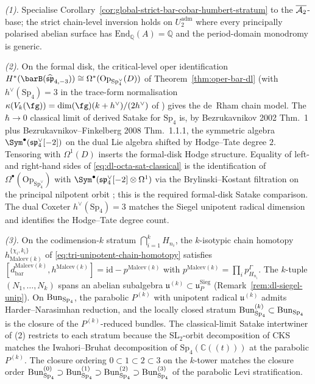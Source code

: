 \begin{remark}
\emph{(1).} Specialise
Corollary~\textup{\ref{cor:global-strict-bar-cobar-humbert-stratum}}
to the $\overline{\mathcal{A}_2}$-base; the strict chain-level inversion holds on
$U_2^{\mathrm{adm}}$ where every principally polarised abelian
surface has $\mathrm{End}_{\mathbb{Q}}(A)=\mathbb{Q}$ and the
period-domain monodromy is generic.

\emph{(2).} On the formal disk, the critical-level oper
identification
$H^*(\barB(\widehat{\mathfrak{sp}}_{4,-3}))\cong
\Omega^*(\mathrm{Op}_{\mathrm{Sp}_4^\vee}(D))$
of Theorem~\ref{thm:oper-bar-dl} (with $h^\vee(\mathrm{Sp}_4)=3$ in
the trace-form normalisation
$\kappa(V_k(\fg))=\dim(\fg)(k+h^\vee)/(2h^\vee)$ of
\cite[Ch.~III \S 6]{Kac1990}) gives the de~Rham chain model. The
$\hbar\to 0$ classical limit of derived Satake for $\mathrm{Sp}_4$
is, by Bezrukavnikov 2002 \cite{Bezrukavnikov2002} Thm.~1 plus
Bezrukavnikov--Finkelberg 2008
\cite{BezrukavnikovFinkelberg2008} Thm.~1.1.1, the symmetric algebra
$\Sym^\bullet(\mathfrak{sp}_4^\vee[-2])$ on the dual Lie algebra
shifted by Hodge--Tate degree $2$. Tensoring with $\Omega^1(D)$
inserts the formal-disk Hodge structure. Equality of left- and
right-hand sides of \eqref{eq:dl-octa-sat-classical} is the
identification of $\Omega^\bullet(\mathrm{Op}_{\mathrm{Sp}_4^\vee})$
with $\Sym^\bullet(\mathfrak{sp}_4^\vee[-2]\otimes\Omega^1)$ via the
Brylinski--Kostant filtration on the principal nilpotent orbit
\cite[\S 4.7]{BezrukavnikovFinkelberg2008}; this is the required
formal-disk Satake comparison. The dual Coxeter
$h^\vee(\mathrm{Sp}_4)=3$ matches the Siegel unipotent radical
dimension and identifies the Hodge--Tate degree count.

\emph{(3).} On the codimension-$k$ stratum
$\bigcap_{i=1}^k H_{n_i}$, the $k$-isotypic chain homotopy
$h^{\{\chi_i,k_i\}}_{\mathrm{Malcev}(k)}$ of
\eqref{eq:tri-unipotent-chain-homotopy} satisfies
$[d^{\mathrm{Malcev}(k)}_{\mathrm{bar}},h^{\mathrm{Malcev}(k)}]
=\mathrm{id}-p^{\mathrm{Malcev}(k)}$ with
$p^{\mathrm{Malcev}(k)}=\prod_i p^{\Gamma}_{H_{n_i}}$. The
$k$-tuple $(N_1,\ldots,N_k)$ spans an abelian subalgebra
$\mathfrak{u}^{(k)}\subset\mathfrak{u}_P^{\mathrm{Sieg}}$
(Remark~\ref{rem:dl-siegel-unip}). On $\mathrm{Bun}_{\mathrm{Sp}_4}$, the parabolic
$P^{(k)}$ with unipotent radical $\mathfrak{u}^{(k)}$ admits
Harder--Narasimhan reduction, and the locally closed stratum
$\mathrm{Bun}_{\mathrm{Sp}_4}^{(k)}\subset\mathrm{Bun}_{\mathrm{Sp}_4}$ is the closure of the $P^{(k)}$-reduced
bundles. The classical-limit Satake intertwiner of (2) restricts to
each stratum because the SL$_2$-orbit decomposition of CKS
\cite[\S 3.7]{CattaniKaplanSchmid1986} matches the
Iwahori--Bruhat decomposition of $\mathrm{Sp}_4(\mathbb{C}((t)))$ at
the parabolic $P^{(k)}$. The closure ordering $0\subset 1\subset 2\subset 3$
on the $k$-tower matches the closure order
$\mathrm{Bun}_{\mathrm{Sp}_4}^{(0)}\supset\mathrm{Bun}_{\mathrm{Sp}_4}^{(1)}\supset\mathrm{Bun}_{\mathrm{Sp}_4}^{(2)}\supset\mathrm{Bun}_{\mathrm{Sp}_4}^{(3)}$
of the parabolic Levi stratification.


\end{remark}
